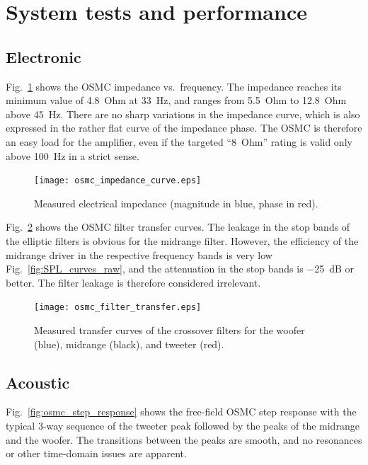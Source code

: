\documentclass[12pt,a4paper]{article}
\providecommand{\figr}[1]{Fig.~\ref{fig:#1}}
\providecommand{\figlabel}[1]{\label{fig:#1}}
\begin{document}
\section{System tests and performance}

\subsection{Electronic}
\figr{osmc_impedance_curve} shows the OSMC impedance vs.\ frequency. The impedance reaches its minimum value of \SI{4.8}{Ohm} at \SI{33}{Hz}, and ranges from \SI{5.5}{Ohm} to \SI{12.8}{Ohm} above \SI{45}{Hz}. There are no sharp variations in the impedance curve, which is also expressed in the rather flat curve of the impedance phase. The OSMC is therefore an easy load for the amplifier, even if the targeted ``\SI{8}{Ohm}'' rating\cite{osmc_p904} is valid only above \SI{100}{Hz} in a strict sense.

\begin{figure}[tbp]
	\centering
	\texttt{[image: osmc\_impedance\_curve.eps]}
	\caption{Measured electrical impedance (magnitude in blue, phase in red).}
	\figlabel{osmc_impedance_curve}
\end{figure}

\figr{osmc_filter_transfer} shows the OSMC filter transfer curves. The leakage in the stop bands of the elliptic filters is obvious for the midrange filter. However, the efficiency of the midrange driver in the respective frequency bands is very low \figr{SPL_curves_raw}, and the attenuation in the stop bands is \SI{-25}{dB} or better. The filter leakage is therefore considered irrelevant.

\begin{figure}[tpb]
	\centering
	\texttt{[image: osmc\_filter\_transfer.eps]}
	\caption{Measured transfer curves of the crossover filters for the woofer (blue), midrange (black), and tweeter (red).}
	\figlabel{osmc_filter_transfer}
\end{figure}


\subsection{Acoustic}
\figr{osmc_step_response} shows the free-field OSMC step response with the typical 3-way sequence of the tweeter peak followed by the peaks of the midrange and the woofer. The transitions between the peaks are smooth, and no resonances or other time-domain issues are apparent.
\end{document}
